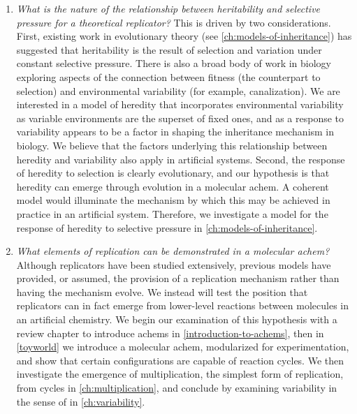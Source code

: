 \begin{enumerate}[label=RQ\arabic*:]
	
	\item \emph{What is the nature of the relationship between heritability and selective pressure for a theoretical replicator?} This is driven by two considerations. First, existing work in evolutionary theory (see \cref{ch:models-of-inheritance}) has suggested that heritability is the result of selection and variation under constant selective pressure. There is also a broad body of work in biology exploring aspects of the connection between fitness (the counterpart to selection) and environmental variability (for example, canalization). We are interested in a model of heredity that incorporates environmental variability as variable environments are the superset of fixed ones, and as a response to variability appears to be a factor in shaping the inheritance mechanism in biology. We believe that the factors underlying this relationship between heredity and variability also apply in artificial systems. Second, the response of heredity to selection is clearly evolutionary, and our hypothesis is that heredity can emerge through evolution in a molecular \gls{achem}. A coherent model would illuminate the mechanism by which this may be achieved in practice in an artificial system. Therefore, we investigate a model for the response of heredity to selective pressure in \cref{ch:models-of-inheritance}.
	
	\item \emph{What elements of replication can be demonstrated in a molecular \gls{achem}?} Although replicators have been studied extensively, previous models have provided, or assumed, the provision of a replication mechanism rather than having the mechanism evolve. We instead will test the position that replicators can in fact emerge from lower-level reactions between molecules in an artificial chemistry. We begin our examination of this hypothesis with a review chapter to introduce \glspl{achem} in \cref{introduction-to-achems}, then in \cref{toyworld} we introduce a molecular \gls{achem}, modularized for experimentation, and show that certain configurations are capable of reaction cycles. We then investigate the emergence of multiplication, the simplest form of replication, from cycles in \cref{ch:multiplication}, and conclude by examining variability in the sense of \textcite{Zachar2010} in \cref{ch:variability}.

\end{enumerate}

